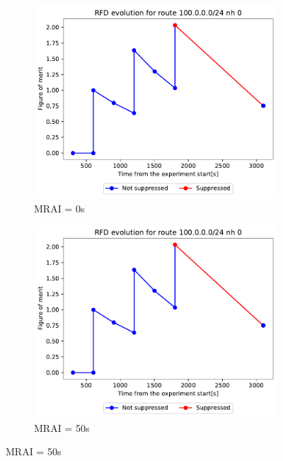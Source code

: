 \begin{figure}[h]
     \centering
     \begin{subfigure}[b]{0.3\textwidth}
         \centering
         \includegraphics[width=\textwidth]{images/RFD/clique/FigureOfMerit/mrai1_RFD_5_rfd_R1.pdf}
         \caption{MRAI = 0s}
         \label{fig:clique_5_mrai0}
     \end{subfigure}
     \hfill
     \begin{subfigure}[b]{0.3\textwidth}
         \centering
         \includegraphics[width=\textwidth]{images/RFD/clique/FigureOfMerit/mrai11_RFD_5_rfd_R1.pdf}
         \caption{MRAI = 50s}
         \label{fig:clique_5_mrai50}

\end{subfigure}
\end{figure}
